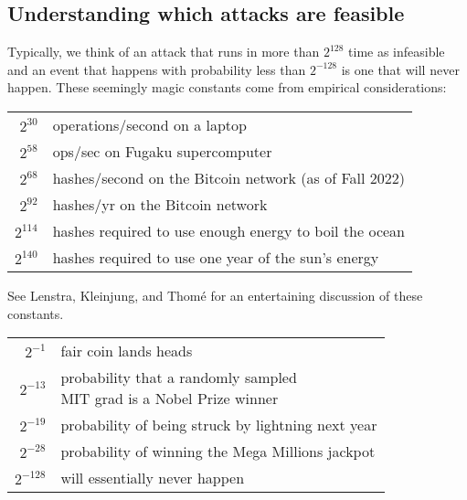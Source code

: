 \subsection{Understanding which attacks are feasible}

Typically, we think of an attack that runs in more than $2^{128}$ time
as infeasible and an event that happens with probability less than $2^{-128}$
is one that will never happen.
These seemingly magic constants come from empirical considerations:

\begin{table}[htpb]
	\centering

	\begin{tabular}{rl}
		$2^{30}$ & operations/second on a laptop \\
		$2^{58}$ & ops/sec on Fugaku supercomputer \\
		$2^{68}$ & hashes/second on the Bitcoin network (as of Fall 2022) \\
    $2^{92}$ & hashes/yr on the Bitcoin network\\
		$2^{114}$ & hashes required to use enough energy to boil the ocean \\
		$2^{140}$ & hashes required to use one year of the sun's energy \\
	\end{tabular}
\end{table}

See Lenstra, Kleinjung, and Thom{\'e} for an entertaining
discussion of these constants.\autocite{lenstra:universal}

\begin{table}[htpb]
	\centering

	\begin{tabular}{rl}
		$2^{-1}$ & fair coin lands heads \\
    $2^{-13}$ & \parbox{3.5in}{probability that a randomly sampled\\[-3pt] MIT grad is a Nobel Prize winner}\\
    $2^{-19}$ & probability of being struck by lightning next year\\
		$2^{-28}$ & probability of winning the Mega Millions jackpot\\
		$2^{-128}$ & will essentially never happen \\
	\end{tabular}
\end{table}



